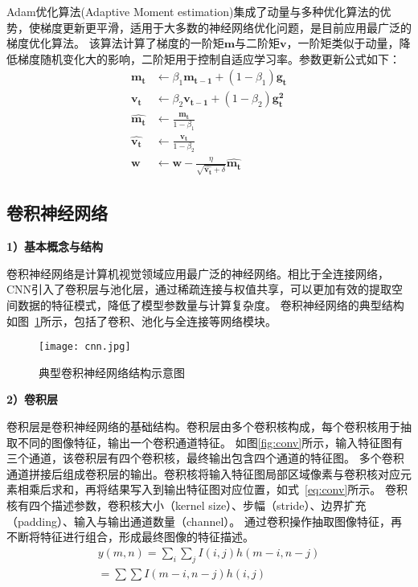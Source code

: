 Adam优化算法(Adaptive Moment estimation)\cite{kingma2020method}集成了动量与多种优化算法的优势，使梯度更新更平滑，适用于大多数的神经网络优化问题，是目前应用最广泛的梯度优化算法。
该算法计算了梯度的一阶矩$\boldsymbol{m}$与二阶矩$\boldsymbol{v}$，一阶矩类似于动量，降低梯度随机变化大的影响，二阶矩用于控制自适应学习率。参数更新公式如下：
\begin{equation}
  \begin{aligned}
    \boldsymbol{m_t}  & \leftarrow  \beta_1 \boldsymbol{m_{t-1}}  + (1 - \beta_1) \boldsymbol{g_t} \\
    \boldsymbol{v_t}  & \leftarrow  \beta_2 \boldsymbol{v_{t-1}}  + (1 - \beta_2) \boldsymbol{g_t^2} \\
    \boldsymbol{\hat{m_t}} &  \leftarrow \frac{\boldsymbol{m_t}}{1 - \beta_1} \\
    \boldsymbol{\hat{v_t}} &  \leftarrow \frac{\boldsymbol{v_t}}{1 - \beta_2} \\
    \boldsymbol{w}  & \leftarrow  \boldsymbol{w} - \frac{\eta}{\sqrt{\boldsymbol{\hat{v_t}} + \delta}} \boldsymbol{\hat{m_t}}
  \end{aligned}
  \label{eq:Adam}
\end{equation}




\subsection{卷积神经网络}

\textbf{1）基本概念与结构}

卷积神经网络\cite{li2021survey}是计算机视觉领域应用最广泛的神经网络。相比于全连接网络，
CNN引入了卷积层与池化层，通过稀疏连接与权值共享，可以更加有效的提取空间数据的特征模式，降低了模型参数量与计算复杂度。
卷积神经网络的典型结构如图~\ref{fig:cnn}所示，包括了卷积、池化与全连接等网络模块。

\begin{figure}[htbp]
  \centering
  \texttt{[image: cnn.jpg]}
  \caption{典型卷积神经网络结构示意图}
  \label{fig:cnn}
\end{figure}

\textbf{2）卷积层}

卷积层是卷积神经网络的基础结构。卷积层由多个卷积核构成，每个卷积核用于抽取不同的图像特征，输出一个卷积通道特征。
如图\ref{fig:conv}所示，输入特征图有三个通道，该卷积层有四个卷积核，最终输出包含四个通道的特征图。
多个卷积通道拼接后组成卷积层的输出。卷积核将输入特征图局部区域像素与卷积核对应元素相乘后求和，再将结果写入到输出特征图对应位置，如式~\ref{eq:conv}所示。
卷积核有四个描述参数，卷积核大小（kernel size）、步幅（stride）、边界扩充（padding）、输入与输出通道数量（channel）。
通过卷积操作抽取图像特征，再不断将特征进行组合，形成最终图像的特征描述。
\begin{equation}
  \begin{array}{l}
    y(m, n)=\sum_{i} \sum_{j} I(i, j) h(m-i, n-j) \\
    =\sum \sum I(m-i, n-j) h(i, j)
    \end{array}
  \label{eq:conv}
\end{equation}


